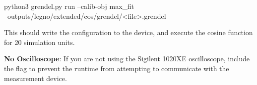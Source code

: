 \begin{snippet}
  python3 grendel.py run --calib-obj max_fit \
  outputs/legno/extended/cos/grendel/<file>.grendel
\end{snippet}

\noindent This should write the configuration to the device, and execute the cosine
function for 20 simulation units.

\noindent\textbf{No Oscilloscope}: If you are not using the
Sigilent 1020XE oscilloscope, include the  flag to prevent
the runtime from attempting to communicate with the measurement device.

\begin{comment}
\section{Mass-Execution and Analysis (oscilloscope required)}
The \tx{exp_driver.py} script automatically runs and analyzes \tx{.grendel}
scripts in the \tx{output} directory. The \tx{exp_driver.py} script works by
invoking \tx{grendel.py} and populates the following subdirectories in the program
directory (Section XXX).

\begin{itemize}
\item\tx{out-waveform}[OSC]: this directory contains the output waveforms
  collected by the oscilloscope during execution.
\item\tx{plots}[OSC]: this directory contains visualizations of the output
  waveforms collected by the oscilloscope. These plots are generated by
  \tx{exp_driver.py}.
\end{itemize}

We first scan for all \tx{.grendel} files in the \tx{output directory}:

\begin{snippet}
  python3 exp_driver.py scan
\end{snippet}

Next, we mass-execute any outstanding \tx{.grendel} scripts,
calibrating blocks when necessary. This mass execution step ignores any grendel
scripts that already have output waveforms (it scans the grendel scripts for a
\tx{osc_get_values} command and checks to see if the associated file exists). 

\begin{snippet}
  python3 exp_driver.py run --calibrate
\end{snippet}
\end{comment}